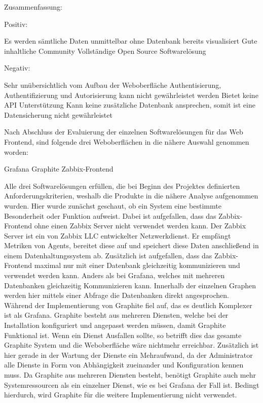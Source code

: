 Zusammenfassung:

Positiv:

\begin{outline}
  \1 Es werden sämtliche Daten unmittelbar ohne Datenbank bereits visualisiert
  \1 Gute inhaltliche Community
  \1 Vollständige Open Source Softwarelösung
\end{outline}

Negativ:

\begin{outline}
  \1 Sehr unübersichtlich vom Aufbau der Weboberfläche
  \1 Authentisierung, Authentifizierung und Autorisierung kann nicht
  gewährleistet werden
  \1 Bietet keine API Unterstützung
  \1 Kann keine zusätzliche Datenbank ansprechen, somit ist eine Datensicherung
  nicht gewährleistet
\end{outline}

Nach Abschluss der Evaluierung der einzelnen Softwarelösungen für das Web
Frontend, sind folgende drei Weboberflächen in die nähere Auswahl genommen
worden:

\begin{outline}
  \1 Grafana
  \1 Graphite
  \1 Zabbix-Frontend
\end{outline}

Alle drei Softwarelösungen erfüllen, die bei Beginn des Projektes definierten
Anforderungskriterien, weshalb die Produkte in die nähere Analyse aufgenommen
wurden. Hier wurde zunächst geschaut, ob ein System eine bestimmte Besonderheit
oder Funktion aufweist. Dabei ist aufgefallen, dass das Zabbix-Frontend ohne
einen Zabbix Server nicht verwendet werden kann. Der Zabbix Server ist ein von
Zabbix LLC entwickelter Netzwerkdienst. Er empfängt Metriken von Agents,
bereitet diese auf und speichert diese Daten anschließend in einem
Datenhaltungssystem ab. Zusätzlich ist aufgefallen, dass das Zabbix-Frontend
maximal nur mit einer Datenbank gleichzeitig kommunizieren und verwendet werden
kann. Anders als bei Grafana, welches mit mehreren Datenbanken gleichzeitig
Kommunizieren kann. Innerhalb der einzelnen Graphen werden hier mittels einer
Abfrage die Datenbanken direkt angesprochen. Während der Implementierung von
Graphite fiel auf, das es deutlich Komplexer ist als Grafana. Graphite besteht
aus mehreren Diensten, welche bei der Installation konfiguriert und
angepasst werden müssen, damit Graphite Funktional ist. Wenn ein Dienst
Ausfallen sollte, so betrifft dies das gesamte Graphite System und die
Weboberfläche wäre nichtmehr erreichbar. Zusätzlich ist hier gerade in der
Wartung der Dienste ein Mehraufwand, da der Administrator alle Dienste in Form
von Abhängigkeit zueinander und Konfiguration kennen muss. Da Graphite aus
mehreren Diensten besteht, benötigt Graphite auch mehr Systemressourcen als ein
einzelner Dienst, wie es bei Grafana der Fall ist. Bedingt hierdurch, wird
Graphite für die weitere Implementierung nicht verwendet.
\mr%

